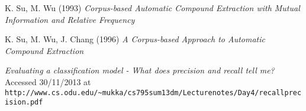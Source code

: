 \documentclass{article}
\begin{document}
\begin{thebibliography}{1}

 K. Su, M. Wu (1993) {\em Corpus-based Automatic Compound Extraction with Mutual Information and Relative Frequency}

 K. Su, M. Wu, J. Chang (1996) {\em A Corpus-based Approach to Automatic Compound Extraction}

 {\em Evaluating a classification model - What does precision and recall tell me?} Accessed 30/11/2013 at \texttt{http://www.cs.odu.edu/\textasciitilde mukka/cs795sum13dm/Lecturenotes/Day4/recallprecision.pdf} 

\end{thebibliography}
\end{document}

